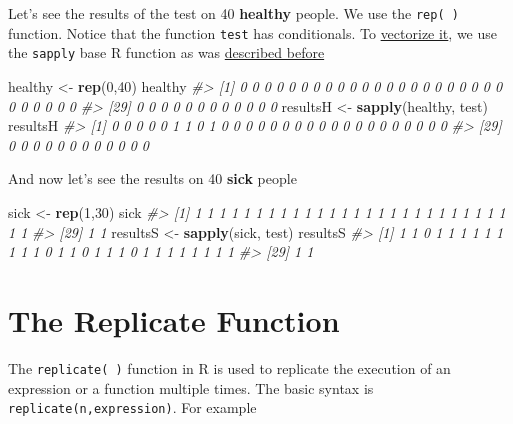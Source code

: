 \documentclass[
]{book}
\newenvironment{Shaded}{\begin{snugshade}}{\end{snugshade}}
\newcommand{\CommentTok}[1]{\textcolor[rgb]{0.56,0.35,0.01}{\textit{#1}}}
\newcommand{\DecValTok}[1]{\textcolor[rgb]{0.00,0.00,0.81}{#1}}
\newcommand{\FunctionTok}[1]{\textcolor[rgb]{0.13,0.29,0.53}{\textbf{#1}}}
\newcommand{\NormalTok}[1]{#1}
\newcommand{\OtherTok}[1]{\textcolor[rgb]{0.56,0.35,0.01}{#1}}
\theoremstyle{definition}
\theoremstyle{definition}
\theoremstyle{definition}
\theoremstyle{definition}
\theoremstyle{remark}
\begin{document}
Let's see the results of the test on 40 \textbf{healthy} people. We use the \texttt{rep(\ )} function. Notice that the function \texttt{test} has conditionals. To \protect\hyperlink{vectorize}{vectorize it}, we use the \texttt{sapply} base R function as was \protect\hyperlink{vectorize}{described before}

\begin{Shaded}
\begin{Highlighting}[]
\NormalTok{healthy }\OtherTok{\textless{}{-}} \FunctionTok{rep}\NormalTok{(}\DecValTok{0}\NormalTok{,}\DecValTok{40}\NormalTok{)}
\NormalTok{healthy}
\CommentTok{\#\textgreater{}  [1] 0 0 0 0 0 0 0 0 0 0 0 0 0 0 0 0 0 0 0 0 0 0 0 0 0 0 0 0}
\CommentTok{\#\textgreater{} [29] 0 0 0 0 0 0 0 0 0 0 0 0}
\NormalTok{resultsH }\OtherTok{\textless{}{-}} \FunctionTok{sapply}\NormalTok{(healthy, test)}
\NormalTok{resultsH}
\CommentTok{\#\textgreater{}  [1] 0 0 0 0 0 1 1 0 1 0 0 0 0 0 0 0 0 0 0 0 0 0 0 0 0 0 0 0}
\CommentTok{\#\textgreater{} [29] 0 0 0 0 0 0 0 0 0 0 0 0}
\end{Highlighting}
\end{Shaded}

And now let's see the results on 40 \textbf{sick} people

\begin{Shaded}
\begin{Highlighting}[]
\NormalTok{sick }\OtherTok{\textless{}{-}} \FunctionTok{rep}\NormalTok{(}\DecValTok{1}\NormalTok{,}\DecValTok{30}\NormalTok{)}
\NormalTok{sick}
\CommentTok{\#\textgreater{}  [1] 1 1 1 1 1 1 1 1 1 1 1 1 1 1 1 1 1 1 1 1 1 1 1 1 1 1 1 1}
\CommentTok{\#\textgreater{} [29] 1 1}
\NormalTok{resultsS }\OtherTok{\textless{}{-}} \FunctionTok{sapply}\NormalTok{(sick, test)}
\NormalTok{resultsS}
\CommentTok{\#\textgreater{}  [1] 1 1 0 1 1 1 1 1 1 1 1 1 0 1 1 0 1 1 1 0 1 1 1 1 1 1 1 1}
\CommentTok{\#\textgreater{} [29] 1 1}
\end{Highlighting}
\end{Shaded}

\hypertarget{the-replicate-function}{%
\section{The Replicate Function}\label{the-replicate-function}}

The \texttt{replicate(\ )} function in R is used to replicate the execution of an expression or a function multiple times. The basic syntax is \texttt{replicate(n,expression)}. For example
\end{document}
